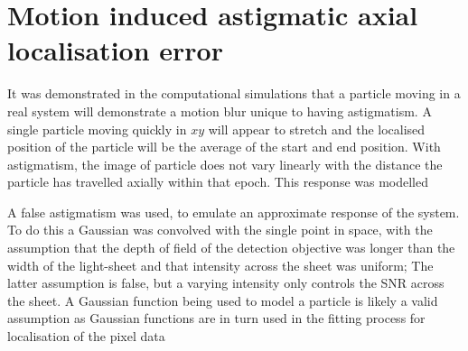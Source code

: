 \section{Motion induced astigmatic axial localisation error}

It was demonstrated in the computational simulations that a particle moving in a real system will demonstrate a motion blur unique to having astigmatism.
A single particle moving quickly in $xy$ will appear to stretch and the localised position of the particle will be the average of the start and end position.
With astigmatism, the image of particle does not vary linearly with the distance the particle has travelled axially within that epoch.
This response was modelled %

A false astigmatism was used, %
to emulate an approximate response of the system.
To do this a Gaussian was convolved with the single point in space, with the assumption that the depth of field of the detection objective was longer than the width of the light-sheet and that intensity across the sheet was uniform;
The latter assumption is false, but a varying intensity only controls the SNR across the sheet.
A Gaussian function being used to model a particle is likely a valid assumption as Gaussian functions are in turn used in the fitting process for localisation of the pixel data


